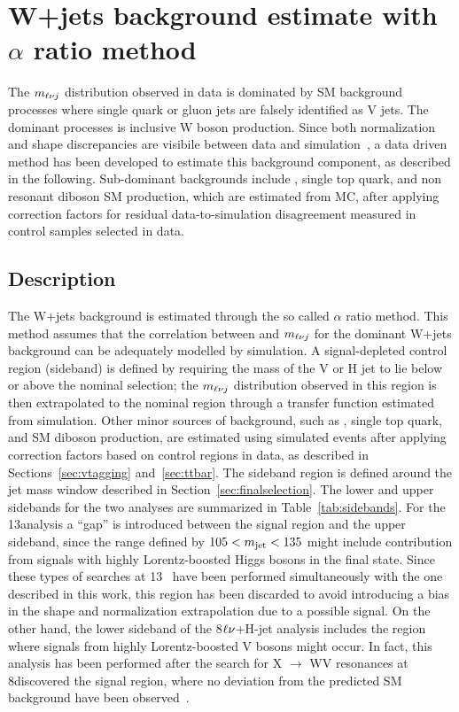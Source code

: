 \section{W+jets background estimate with $\alpha$ ratio method}\label{sec:alpha}

The $m_{\ell\nu j}$ distribution observed in data is dominated by SM background processes where single
quark or gluon jets are falsely identified as V jets. The dominant
processes is inclusive W boson production. 
Since both normalization and shape discrepancies are visibile between data and simulation~\cite{Chatrchyan:2013vbb},
a data driven method has been developed to estimate this background component, as described in the following.
Sub-dominant backgrounds include \ttbar, single top quark, and non resonant diboson SM production,
which are estimated from MC, after applying correction factors for residual data-to-simulation disagreement measured in control samples selected in data.

\subsection{Description}

The W+jets background is estimated through the so called $\alpha$ ratio method.
This method assumes that the correlation between \mJ and $m_{\ell\nu j}$ for the dominant W+jets background can be adequately modelled by simulation.
A signal-depleted control region (sideband) is defined by requiring the mass of the V or H jet to lie below or above the nominal selection; the
$m_{\ell\nu j}$ distribution observed in this region is then extrapolated to the nominal region through
a transfer function estimated from simulation. Other minor sources of background, such as
\ttbar, single top quark, and SM diboson production, are estimated using simulated events after
applying correction factors based on control regions in data, as described in Sections~\ref{sec:vtagging} and~\ref{sec:ttbar}.
The sideband region is defined around the jet mass window described in Section~\ref{sec:finalselection}.
The lower and upper sidebands for the two analyses are summarized in Table~\ref{tab:sidebands}.
For the 13\TeV analysis a ``gap'' is introduced between the signal region and the upper sideband, since the
range defined by $105 < m_{\text{jet}} < 135$ might include contribution from signals with highly Lorentz-boosted Higgs bosons in the final state.
Since these types of searches at 13\TeV~\cite{Khachatryan:2016cfx} have been performed simultaneously with the one described in this work,
this region has been discarded to avoid introducing a bias in the shape and normalization extrapolation due to a possible signal.
On the other hand, the lower sideband of the 8\TeV $\ell\nu$+H-jet analysis includes the region where signals from highly Lorentz-boosted V bosons might occur.
In fact, this analysis has been performed after the search for X $\rightarrow$ WV resonances at 8\TeV discovered the signal region,
where no deviation from the predicted SM background have been observed~\cite{Khachatryan:2014gha}.

